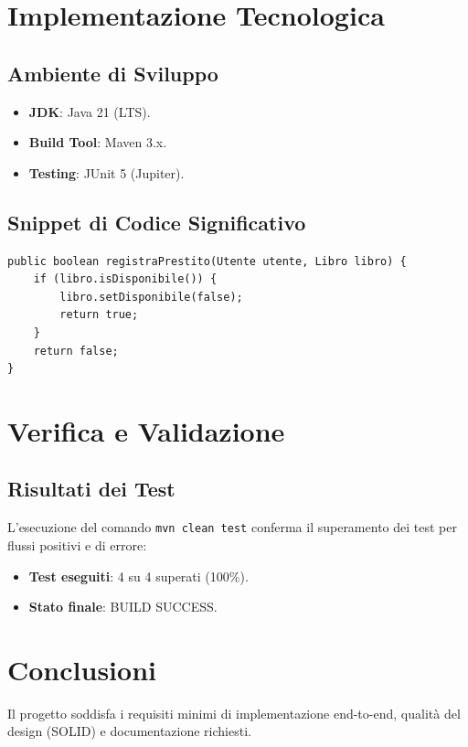 \documentclass[12pt, a4paper]{article}
\begin{document}
\section{Implementazione Tecnologica}
\subsection{Ambiente di Sviluppo}
\begin{itemize}
    \item \textbf{JDK}: Java 21 (LTS).
    \item \textbf{Build Tool}: Maven 3.x.
    \item \textbf{Testing}: JUnit 5 (Jupiter).
\end{itemize}

\subsection{Snippet di Codice Significativo}
\begin{lstlisting}[caption={Logica di validazione del prestito in GestorePrestiti.java }]
public boolean registraPrestito(Utente utente, Libro libro) {
    if (libro.isDisponibile()) {
        libro.setDisponibile(false);
        return true;
    }
    return false;
}
\end{lstlisting}

\section{Verifica e Validazione}
\subsection{Risultati dei Test}
L'esecuzione del comando \texttt{mvn clean test} conferma il superamento dei test per flussi positivi e di errore:
\begin{itemize}
    \item \textbf{Test eseguiti}: 4 su 4 superati (100\%).
    \item \textbf{Stato finale}: BUILD SUCCESS.
\end{itemize}

\section{Conclusioni}
Il progetto soddisfa i requisiti minimi di implementazione end-to-end, qualità del design (SOLID) e documentazione richiesti.
\end{document}
